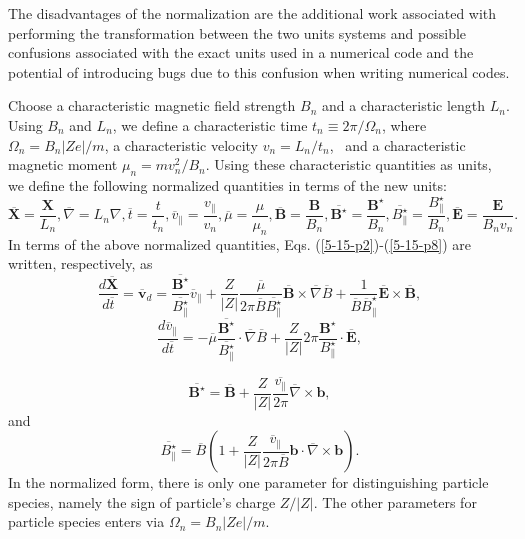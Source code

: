 \documentclass{article}
\begin{document}
The disadvantages of the normalization are the additional work associated with
performing the transformation between the two units systems and possible
confusions associated with the exact units used in a numerical code and the
potential of introducing bugs due to this confusion when writing numerical
codes.

Choose a characteristic magnetic field strength $B_n$ and a characteristic
length $L_n$. Using $B_n$ and $L_n$, we define a characteristic time $t_n
\equiv 2 \pi / \Omega_n$, where $\Omega_n = B_n | Z e | / m$, a characteristic
velocity $v_n = L_n / t_n$, \ and a characteristic magnetic moment $\mu_n = m
v_n^2 / B_n$. Using these characteristic quantities as units, we define the
following normalized quantities in terms of the new units:
\begin{equation}
  \overline{\mathbf{X}} = \frac{\mathbf{X}}{L_n}, \overline{\nabla} = L_n
  \nabla, \overline{t} = \frac{t}{t_n}, \overline{v}_{\parallel} =
  \frac{v_{\parallel}}{v_n}, \overline{\mu} = \frac{\mu}{\mu_n},
  \overline{\mathbf{B}} = \frac{\mathbf{B}}{B_n},
  \overline{\mathbf{B}^{\star}} = \frac{\mathbf{B}^{\star}}{B_n},
  \overline{B^{\star}_{\parallel}} = \frac{B^{\star}_{\parallel}}{B_n},
  \overline{\mathbf{E}} = \frac{\mathbf{E}}{B_n v_n} .
\end{equation}
In terms of the above normalized quantities, Eqs.
(\ref{5-15-p2})-(\ref{5-15-p8}) are written, respectively, as
\begin{equation}
  \label{18-3-29-p1} \frac{d \overline{\mathbf{X}}}{d \overline{t}} =
  \overline{\mathbf{v}}_d =
  \frac{\overline{\mathbf{B}^{\star}}}{\overline{B^{\star}_{\parallel}}}
  \overline{v}_{\parallel} + \frac{Z}{| Z |}  \frac{\overline{\mu}}{2 \pi
  \overline{B}  \overline{B^{\star}_{\parallel}}} \overline{\mathbf{B}} \times
  \overline{\nabla} \overline{B} + \frac{1}{\overline{B} 
  \overline{B}^{\star}_{\parallel}} \overline{\mathbf{E}} \times
  \overline{\mathbf{B}},
\end{equation}
\begin{equation}
  \frac{d \overline{v}_{\parallel}}{d \overline{t}} = - \overline{\mu}
  \frac{\overline{\mathbf{B}^{\star}}}{\overline{B^{\star}_{\parallel}}} \cdot
  \overline{\nabla} \overline{B} + \frac{Z}{| Z |} 2 \pi
  \frac{\mathbf{B}^{\star}}{B^{\star}_{\parallel}} \cdot
  \overline{\mathbf{E}},
\end{equation}

\begin{equation}
  \overline{\mathbf{B}^{\star}} = \overline{\mathbf{B}} + \frac{Z}{| Z |} 
  \frac{\overline{v_{\parallel}}}{2 \pi} \overline{\nabla} \times \mathbf{b},
\end{equation}
and
\begin{equation}
  \overline{B^{\star}_{\parallel}} = \overline{B} \left( 1 + \frac{Z}{| Z |} 
  \frac{\overline{v}_{\parallel}}{2 \pi \overline{B}} \mathbf{b} \cdot
  \overline{\nabla} \times \mathbf{b} \right) .
\end{equation}
In the normalized form, there is only one parameter for distinguishing
particle species, namely the sign of particle's charge $Z / | Z |$. The other
parameters for particle species enters via $\Omega_n = B_n | Z e | / m$.
\end{document}

